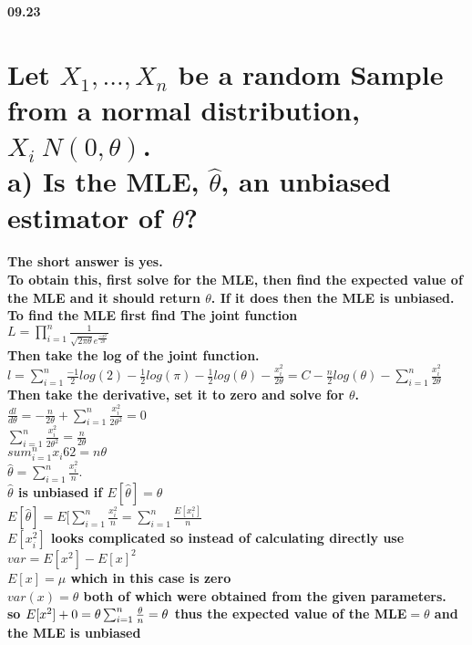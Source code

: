 { \bf 09.23 }
\section*{Let $X_{1},...,X_{n}$ be a random Sample from a normal distribution, $X_{i}~N(0,\theta)$.\\
a) Is the MLE, $\hat{\theta}$, an unbiased estimator of $\theta$?}
\paragraph*{
The short answer is yes.  \\
To obtain this, first solve for the MLE, then find the expected value of the MLE and it should return $\theta$.  If it does then the MLE is unbiased.\\
To find the MLE first find The joint function\\
$L=\prod_{i=1}^n \frac{1}{\sqrt{2\pi\theta}e^\frac{-x^2}{2\theta}}$\\
Then take the log of the joint function.\\
$l=\sum_{i=1}^n \frac{-1}{2}log(2)-\frac{1}{2}log(\pi)-\frac{1}{2}log(\theta)-\frac{x_{i}^2}{2\theta}=C-\frac{n}{2}log(\theta)-\sum_{i=1}^n \frac{x_{i}^2}{2\theta}$\\
Then take the derivative, set it to zero and solve for $\theta$.\\
$\frac{dl}{d\theta}=-\frac{n}{2\theta}+\sum_{i=1}^n \frac{x_{i}^2}{2\theta^2}=0$\\
$\sum_{i=1}^n \frac{x_{i}^2}{2\theta^2}=\frac{n}{2\theta}$\\
$sum_{i=1}^n x_{i}62=n\theta$\\
$\hat{\theta}=\sum_{i=1}^n \frac{x_{i}^2}{n}.$\\
$\hat{\theta}$ is unbiased if $E[\hat{\theta}]=\theta$\\
$E[\hat{\theta}]=E[\sum_{i=1}^n \frac{x_{i}^2}{n}=\sum_{i=1}^n \frac{E[x_{i}^2]}{n}$\\
$E[x_{i}^2]$ looks complicated so instead of calculating directly use $var=E[x^2]-E[x]^2$\\
$E[x]=\mu$ which in this case is zero\\
$var(x)=\theta$ both of which were obtained from the given parameters.\\
so $E[x^2]+0=\theta\\
\sum_{i=1}^n \frac{\theta}{n}=\theta$
thus the expected value of the MLE$=\theta$ and the MLE is unbiased}